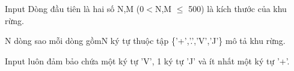 Input
Dòng đầu tiên là hai số N,M (0$<$N,M  $\le$ 500) là kích thước của khu rừng.  

   N dòng sao mỗi dòng gồmN ký tự thuộc tập \{'+','.','V','J'\} mô tả khu rừng.  

   Input luôn đảm bảo chứa một ký tự 'V', 1 ký tự 'J' và ít nhất một ký tự '+'.